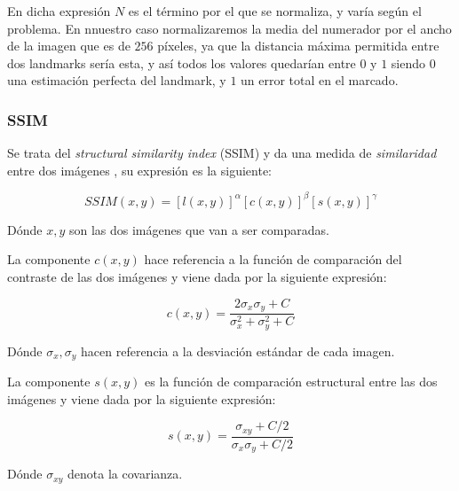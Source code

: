             \noindent En dicha expresión $N$ es el término por el que se normaliza, y varía según el problema. En nnuestro caso normalizaremos la media del numerador por el ancho de la imagen que es de $256$ píxeles, ya que la distancia máxima permitida entre dos landmarks sería esta, y así todos los valores quedarían entre $0$ y $1$ siendo $0$ una estimación perfecta del landmark, y $1$ un error total en el marcado.

            \subsubsection{SSIM}
            \noindent Se trata del \textit{structural similarity index} (SSIM) y da una medida de \textit{similaridad} entre dos imágenes \cite{wang2004image}, su expresión es la siguiente: 

            \begin{equation}
                SSIM(x,y)=[l(x,y)]^\alpha[c(x,y)]^{\beta}[s(x,y)]^{\gamma}
            \end{equation}

            \medskip

            \noindent Dónde $x,y$ son las dos imágenes que van a ser comparadas.

            \medskip

            \noindent La componente $c(x,y)$ hace referencia a la función de comparación del contraste de las dos imágenes y viene dada por la siguiente expresión: 

            \begin{equation}
                c(x,y)=\frac{2\sigma_x \sigma_y + C}{\sigma_x^2+ \sigma_y^2+C}
            \end{equation}

            \noindent Dónde $\sigma_x, \sigma_y$ hacen referencia a la desviación estándar de cada imagen.

            \medskip

            \noindent La componente $s(x,y)$ es la función de comparación estructural entre las dos imágenes y viene dada por la siguiente expresión:

            \begin{equation}
                s(x,y)=\frac{\sigma_{xy}+C/2}{\sigma_x \sigma_y +C/2}
            \end{equation}

            \noindent Dónde $\sigma_{xy}$ denota la covarianza.

